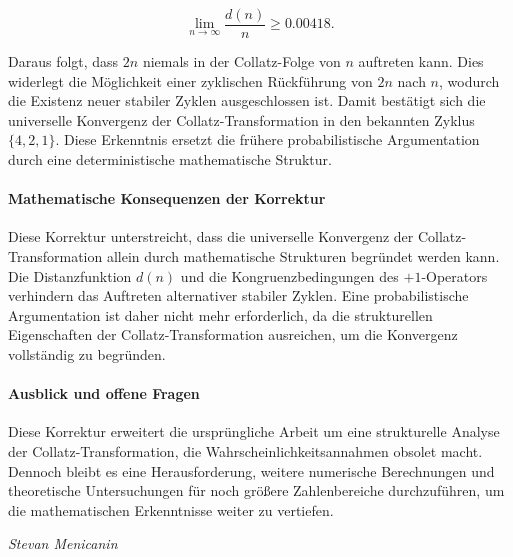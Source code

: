 \documentclass[a4paper,12pt]{article}
\begin{document}
\[
\lim_{n \to \infty} \frac{d(n)}{n} \geq 0.00418.
\]

Daraus folgt, dass \( 2n \) niemals in der Collatz-Folge von \( n \) auftreten kann. Dies widerlegt die Möglichkeit einer zyklischen Rückführung von \( 2n \) nach \( n \), wodurch die Existenz neuer stabiler Zyklen ausgeschlossen ist. Damit bestätigt sich die universelle Konvergenz der Collatz-Transformation in den bekannten Zyklus \( \{4,2,1\} \). Diese Erkenntnis ersetzt die frühere probabilistische Argumentation durch eine deterministische mathematische Struktur.

\paragraph{Mathematische Konsequenzen der Korrektur}  
Diese Korrektur unterstreicht, dass die universelle Konvergenz der Collatz-Transformation allein durch mathematische Strukturen begründet werden kann. Die Distanzfunktion \( d(n) \) und die Kongruenzbedingungen des \(+1\)-Operators verhindern das Auftreten alternativer stabiler Zyklen. Eine probabilistische Argumentation ist daher nicht mehr erforderlich, da die strukturellen Eigenschaften der Collatz-Transformation ausreichen, um die Konvergenz vollständig zu begründen.

\paragraph{Ausblick und offene Fragen}  
Diese Korrektur erweitert die ursprüngliche Arbeit um eine strukturelle Analyse der Collatz-Transformation, die Wahrscheinlichkeitsannahmen obsolet macht. Dennoch bleibt es eine Herausforderung, weitere numerische Berechnungen und theoretische Untersuchungen für noch größere Zahlenbereiche durchzuführen, um die mathematischen Erkenntnisse weiter zu vertiefen.



\vspace{1cm}
\begin{flushright}
\textit{Stevan Menicanin}
\end{flushright}


\newpage
\pagestyle{empty}  %
\clearpage
\end{document}
